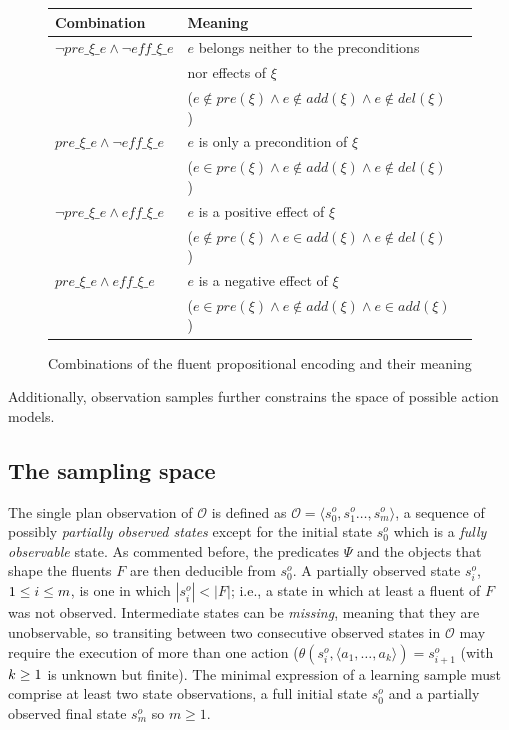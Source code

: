 \documentclass{article}
\newcommand{\tup}[1]{{\langle #1 \rangle}}
\begin{document}
\begin{figure}
	\begin{footnotesize}
		\begin{tabular}{lll}
			{\bf Combination} & {\bf Meaning}\\\hline
			$\neg pre\_\xi\_e \wedge \neg eff\_\xi\_e $& $e$ belongs neither to the preconditions \\
             & nor effects of $\xi$ \\
             & ($e \notin pre(\xi) \wedge e \notin add(\xi) \wedge e \notin del(\xi)$)\\
			$pre\_\xi\_e \wedge \neg eff\_\xi\_e $& $e$ is only a precondition of $\xi$\\
               &  ($e \in pre(\xi) \wedge e \notin add(\xi) \wedge e \notin del(\xi)$) \\
			$\neg pre\_\xi\_e \wedge eff\_\xi\_e $& $e$ is a positive effect of $\xi$ \\
               &  ($e \notin pre(\xi) \wedge e \in add(\xi) \wedge e \notin del(\xi)$) \\
			$pre\_\xi\_e \wedge eff\_\xi\_e  $& $e$ is a negative effect of $\xi$ \\
               &  ($e \in pre(\xi) \wedge e \notin add(\xi) \wedge e \in add(\xi)$) \\
		\end{tabular}
	\end{footnotesize}
	\caption{\small Combinations of the fluent propositional encoding and their meaning}
	\label{fig:combinations}
\end{figure}

Additionally, observation samples further constrains the space of possible action models.


\subsection{The sampling space}

The single plan observation of $\mathcal{O}$ is defined as $\mathcal{O}=\tup{s_0^o,s_1^o \ldots, s_m^o}$, a sequence of possibly {\em partially observed states} except for the initial state $s_0^o$ which is a {\em fully observable} state. As commented before, the predicates $\Psi$ and the objects that shape the fluents $F$ are then deducible from $s_0^o$. A partially observed state $s_i^o$, ${\small 1\leq i\leq m}$, is one in which $|s_i^o| < |F|$; i.e., a state in which at least a fluent of $F$ was not observed. Intermediate states can be {\em missing}, meaning that they are unobservable, so transiting between two consecutive observed states in $\mathcal{O}$ may require the execution of more than one action ($\theta(s_i^o,\tup{a_1,\ldots,a_k})=s_{i+1}^o$ (with ${\small k\geq 1}$ is unknown but finite). The minimal expression of a learning sample must comprise at least two state observations, a full initial state $s_0^o$ and a partially observed final state $s_m^o$ so $m \geq 1$.
\end{document}
